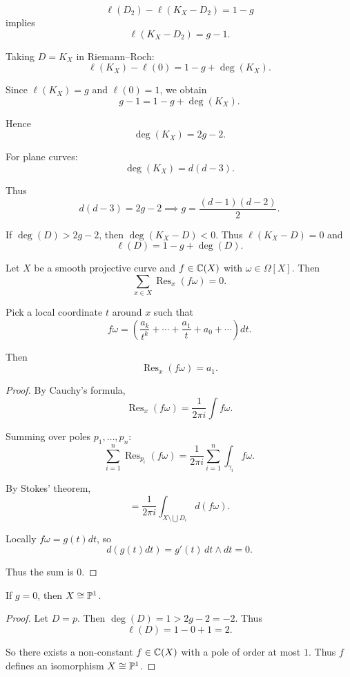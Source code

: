 \[
    \ell(D_2) - \ell(K_X - D_2) = 1 - g
\]
implies
\[
    \ell(K_X - D_2) = g - 1.
\]

Taking $D = K_X$ in Riemann--Roch:
\[
    \ell(K_X) - \ell(0) = 1 - g + \deg(K_X).
\]

Since $\ell(K_X) = g$ and $\ell(0) = 1$, we obtain
\[
    g - 1 = 1 - g + \deg(K_X).
\]

Hence
\[
    \deg(K_X) = 2g - 2.
\]

For plane curves:
\[
    \deg(K_X) = d(d - 3).
\]

Thus
\[
    d(d - 3) = 2g - 2 \implies g = \frac{(d - 1)(d - 2)}{2}.
\]

If $\deg(D) > 2g - 2$, then $\deg(K_X - D) < 0$.
Thus $\ell(K_X - D) = 0$ and
\[
    \ell(D) = 1 - g + \deg(D).
\]

\begin{theorem*}{
    Let $X$ be a smooth projective curve and $f\in\mathbb{C}(X)$ with $\omega\in\Omega[X]$.
    Then
    \[
        \sum_{x\in X} \operatorname{Res}_x(f\omega) = 0.
    \]
}
\end{theorem*}

Pick a local coordinate $t$ around $x$ such that
\[
    f\omega = \left(\frac{a_k}{t^k} + \cdots + \frac{a_1}{t} + a_0 + \cdots \right)dt.
\]

Then
\[
    \operatorname{Res}_x(f\omega) = a_1.
\]

\begin{proof}
    By Cauchy's formula,
    \[
        \operatorname{Res}_x(f\omega) = \frac{1}{2\pi i}\int f\omega.
    \]

    Summing over poles $p_1,\ldots,p_n$:
    \[
        \sum_{i=1}^n \operatorname{Res}_{p_i}(f\omega)
        = \frac{1}{2\pi i} \sum_{i=1}^n \int_{\gamma_i} f\omega.
    \]

    By Stokes' theorem,
    \[
        = \frac{1}{2\pi i} \int_{X \setminus \bigcup D_i} d(f\omega).
    \]

    Locally $f\omega = g(t)dt$, so
    \[
        d(g(t)dt) = g'(t)\,dt \wedge dt = 0.
    \]

    Thus the sum is $0$.
\end{proof}

\begin{theorem*}{
    If $g = 0$, then $X \cong \mathbb{P}^1$.
}
\end{theorem*}

\begin{proof}
    Let $D = p$.
    Then $\deg(D) = 1 > 2g - 2 = -2$.
    Thus
    \[
        \ell(D) = 1 - 0 + 1 = 2.
    \]

    So there exists a non-constant $f \in \mathbb{C}(X)$ with a pole of order at most $1$.
    Thus $f$ defines an isomorphism $X \cong \mathbb{P}^1$.
\end{proof}

